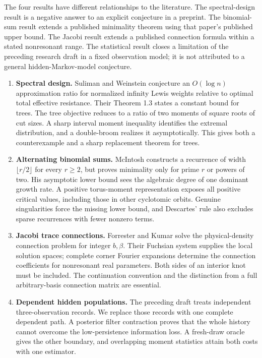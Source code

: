 \documentclass[11pt,a4paper]{article}
\theoremstyle{definition}
\theoremstyle{remark}
\numberwithin{equation}{section}
\begin{document}
The four results have different relationships to the literature.
The spectral-design result is a negative answer to an explicit conjecture
in a preprint. The binomial-sum result extends a published minimality
theorem using that paper's published upper bound. The Jacobi result
extends a published connection formula within a stated nonresonant range.
The statistical result closes a limitation of the preceding research
draft in a fixed observation model; it is not attributed to a general
hidden-Markov-model conjecture.

\begin{enumerate}[leftmargin=*,itemsep=6pt]
\item \textbf{Spectral design.} Suliman and Weinstein
\cite{p2:SulimanWeinstein2023} conjecture an $O(\log n)$ approximation ratio
for normalized infinity Lewis weights relative to optimal total effective
resistance. Their Theorem 1.3 states a constant bound for trees.
The tree objective reduces to a ratio of two moments of square roots of
cut sizes. A sharp interval moment inequality identifies the extremal
distribution, and a double-broom realizes it asymptotically. This gives
both a counterexample and a sharp replacement theorem for trees.

\item \textbf{Alternating binomial sums.} McIntosh
\cite{p3:McIntosh1993} constructs a recurrence of width $\lfloor r/2\rfloor$
for every $r\ge2$, but proves minimality only for prime $r$ or powers of
two. His asymptotic lower bound sees the algebraic degree of one dominant
growth rate. A positive torus-moment representation exposes all positive
critical values, including those in other cyclotomic orbits. Genuine
singularities force the missing lower bound, and Descartes' rule also
excludes sparse recurrences with fewer nonzero terms.

\item \textbf{Jacobi trace connections.} Forrester and Kumar
\cite{p8:SFB_FK} solve the physical-density connection problem for integer
$b,\beta$. Their Fuchsian system supplies the local solution spaces;
complete corner Fourier expansions determine the connection coefficients
for nonresonant real parameters. Both sides of an interior knot must be
included. The continuation convention and the distinction from a full
arbitrary-basis connection matrix are essential.

\item \textbf{Dependent hidden populations.} The preceding draft
\cite{p2:KeioTransfer2026} treats independent three-observation records.
We replace those records with one complete dependent path. A posterior
filter contraction proves that the whole history cannot overcome the
low-persistence information loss. A fresh-draw oracle gives the other
boundary, and overlapping moment statistics attain both costs with one
estimator.
\end{enumerate}
\end{document}
